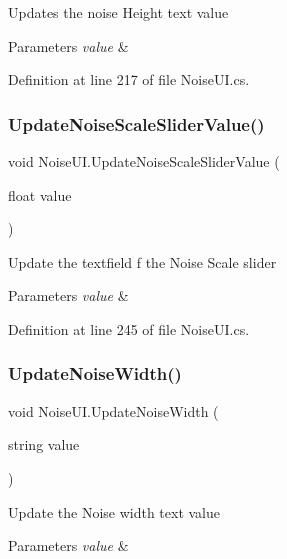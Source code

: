 Updates the noise Height text value 


\begin{DoxyParams}{Parameters}
{\em value} & \\
\hline
\end{DoxyParams}


Definition at line 217 of file Noise\+U\+I.\+cs.

\mbox{\label{class_noise_u_i_afc977291b660b70057bacd53bfb2dcde}} 
\subsubsection{Update\+Noise\+Scale\+Slider\+Value()}
{\footnotesize\ttfamily void Noise\+U\+I.\+Update\+Noise\+Scale\+Slider\+Value (\begin{DoxyParamCaption}\item[{float}]{value }\end{DoxyParamCaption})}



Update the textfield f the Noise Scale slider 


\begin{DoxyParams}{Parameters}
{\em value} & \\
\hline
\end{DoxyParams}


Definition at line 245 of file Noise\+U\+I.\+cs.

\mbox{\label{class_noise_u_i_a8448837e32fa3ae4ef35c5799c918c7f}} 
\subsubsection{Update\+Noise\+Width()}
{\footnotesize\ttfamily void Noise\+U\+I.\+Update\+Noise\+Width (\begin{DoxyParamCaption}\item[{string}]{value }\end{DoxyParamCaption})}



Update the Noise width text value 


\begin{DoxyParams}{Parameters}
{\em value} & \\
\hline
\end{DoxyParams}


